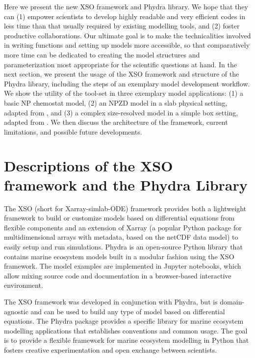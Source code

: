 \documentclass[journal abbreviation, manuscript]{copernicus}
\begin{document}
Here we present the new XSO framework and Phydra library. We hope that they can (1) empower scientists to develop highly readable and very efficient codes in less time than that usually required by existing modelling tools, and (2) foster productive collaborations. Our ultimate goal is to make the technicalities involved in writing functions and setting up models more accessible, so that comparatively more time can be dedicated to creating the model structures and parameterization most appropriate for the scientific questions at hand. In the next section, we present the usage of the XSO framework and structure of the Phydra library, including the steps of an exemplary model development workflow. We show the utility of the tool-set in three exemplary model applications: (1) a basic NP chemostat model, (2) an NPZD model in a slab physical setting, adapted from \citet{Anderson2015c}, and (3) a complex size-resolved model in a simple box setting, adapted from \citet{Banas2011b}. We then discuss the architecture of the framework, current limitations, and possible future developments.



\section{Descriptions of the XSO framework and the Phydra Library} \label{Section:phydrapackage}

The XSO (short for Xarray-simlab-ODE) framework provides both a lightweight framework to build or customize models based on differential equations from flexible components and an extension of Xarray (a popular Python package for multidimensional arrays with metadata, based on the netCDF data model) to easily setup and run simulations. Phydra is an open-source Python library that contains marine ecosystem models built in a modular fashion using the XSO framework. The model examples are implemented in Jupyter notebooks, which allow mixing source code and documentation in a browser-based interactive environment. 

The XSO framework was developed in conjunction with Phydra, but is domain-agnostic and can be used to build any type of model based on differential equations. The Phydra package provides a specific library for marine ecosystem modelling applications that establishes conventions and common usage. The goal is to provide a flexible framework for marine ecosystem modelling in Python that fosters creative experimentation and open exchange between scientists.
\end{document}
